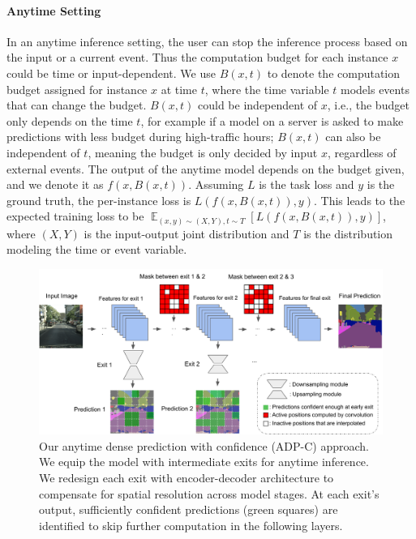 \documentclass{article} %
\begin{document}
\paragraph{Anytime Setting }
\label{sec:anytime}
In an anytime inference setting, the user can stop the inference process based on the input or a current event.
Thus the computation budget for each instance $x$ could be time or input-dependent.
We use $B(x, t)$ to denote the computation budget assigned for instance $x$ at time $t$, where the time variable $t$ models events that can change the budget.
$B(x, t)$ could be independent of $x$, i.e., the budget only depends on the time $t$, for example if a model on a server is asked to make predictions with less budget during high-traffic hours; $B(x, t)$ can also be independent of $t$, meaning the budget is only decided by input $x$, regardless of external events.
The output of the anytime model depends on the budget given, and we denote it as $f(x, B(x, t))$.
Assuming $L$ is the task loss and $y$ is the ground truth, the per-instance loss is $L(f\left(x, B\left(x, t\right)\right), y)$.
This leads to the expected training loss to be $\mathop{\mathbb{E}}_{(x,y)\sim (X, Y), t\sim T}[L(f\left(x, B\left(x, t\right)\right), y)]$, where $(X, Y)$ is the input-output joint distribution and $T$ is the distribution modeling the time or event variable.

\begin{figure}[t]
\vspace{-7ex}\includegraphics[width=\textwidth]{fig1.pdf}
\vspace{-2ex}
\caption{%
Our anytime dense prediction with confidence (ADP-C) approach. 
We equip the model with intermediate exits for anytime inference.
We redesign each exit with encoder-decoder architecture to compensate for spatial resolution across model stages.
At each exit's output, sufficiently confident predictions (green squares) are identified to skip further computation in the following layers.
}
\vspace{-2ex}
\label{fig:fig1}
\end{figure}
\end{document}
